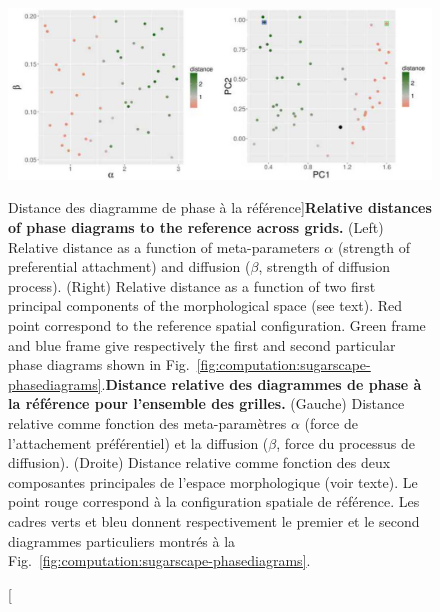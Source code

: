 
\begin{figure}
\includegraphics[width=\linewidth]{Figures/Final/3-1-3-fig-computation-sugarscape-distance.jpg}
\caption[Distances of phase diagrams to the reference][Distance des diagramme de phase à la référence]{\textbf{Relative distances of phase diagrams to the reference across grids.} (Left) Relative distance as a function of meta-parameters $\alpha$ (strength of preferential attachment) and diffusion ($\beta$, strength of diffusion process). (Right) Relative distance as a function of two first principal components of the morphological space (see text). Red point correspond to the reference spatial configuration. Green frame and blue frame give respectively the first and second particular phase diagrams shown in Fig.~\ref{fig:computation:sugarscape-phasediagrams}.\label{fig:computation:sugarscape-distance}}{\textbf{Distance relative des diagrammes de phase à la référence pour l'ensemble des grilles.} (Gauche) Distance relative comme fonction des meta-paramètres $\alpha$ (force de l'attachement préférentiel) et la diffusion ($\beta$, force du processus de diffusion). (Droite) Distance relative comme fonction des deux composantes principales de l'espace morphologique (voir texte). Le point rouge correspond à la configuration spatiale de référence. Les cadres verts et bleu donnent respectivement le premier et le second diagrammes particuliers montrés à la Fig.~\ref{fig:computation:sugarscape-phasediagrams}.\label{fig:computation:sugarscape-distance}}
\end{figure}



